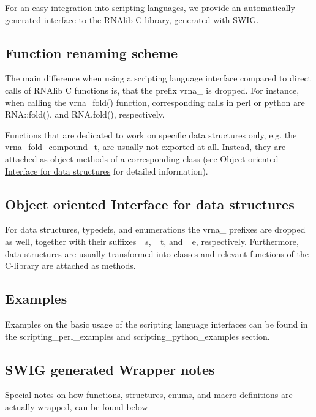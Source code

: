 For an easy integration into scripting languages, we provide an automatically generated interface to the R\+N\+Alib C-\/library, generated with S\+W\+IG.\hypertarget{wrappers_scripting_renaming}{}\subsection{Function renaming scheme}\label{wrappers_scripting_renaming}
The main difference when using a scripting language interface compared to direct calls of R\+N\+Alib C functions is, that the prefix \textquotesingle{}vrna\+\_\+\textquotesingle{} is dropped. For instance, when calling the \hyperlink{group__mfe__fold__single_ga29a33b2895f4e67b0480271ff289afdc}{vrna\+\_\+fold()} function, corresponding calls in perl or python are R\+N\+A\+::fold(), and R\+N\+A.\+fold(), respectively.

Functions that are dedicated to work on specific data structures only, e.\+g. the \hyperlink{group__fold__compound_ga1b0cef17fd40466cef5968eaeeff6166}{vrna\+\_\+fold\+\_\+compound\+\_\+t}, are usually not exported at all. Instead, they are attached as object methods of a corresponding class (see \hyperlink{wrappers_scripting_oo_interface}{Object oriented Interface for data structures} for detailed information).\hypertarget{wrappers_scripting_oo_interface}{}\subsection{Object oriented Interface for data structures}\label{wrappers_scripting_oo_interface}
For data structures, typedefs, and enumerations the \textquotesingle{}vrna\+\_\+\textquotesingle{} prefixes are dropped as well, together with their suffixes \textquotesingle{}\+\_\+s\textquotesingle{}, \textquotesingle{}\+\_\+t\textquotesingle{}, and \textquotesingle{}\+\_\+e\textquotesingle{}, respectively. Furthermore, data structures are usually transformed into classes and relevant functions of the C-\/library are attached as methods.\hypertarget{wrappers_scripting_examples}{}\subsection{Examples}\label{wrappers_scripting_examples}
Examples on the basic usage of the scripting language interfaces can be found in the scripting\+\_\+perl\+\_\+examples and scripting\+\_\+python\+\_\+examples section.\hypertarget{wrappers_scripting_wrapper_notes}{}\subsection{S\+W\+I\+G generated Wrapper notes}\label{wrappers_scripting_wrapper_notes}
Special notes on how functions, structures, enums, and macro definitions are actually wrapped, can be found below


